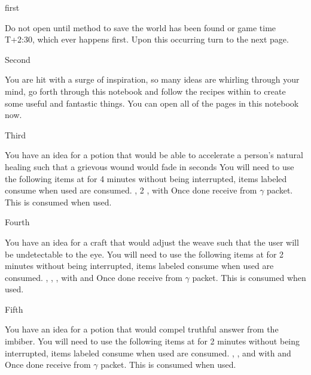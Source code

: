 \documentclass[greennotebook]{guildcamp3} %
\begin{document}
\startnotebook{\nMagTwoRecipes{}}

\begin{page}{first}
	
	Do not open until method to save the world has been found or game time T+2:30, which ever happens first. Upon this occurring turn to the next page.
	
\end{page}

\begin{page}{Second}
	
	You are hit with a surge of inspiration, so many ideas are whirling through your mind, go forth through this notebook and follow the recipes within to create some useful and fantastic things. You can open all of the pages in this notebook now.
	
\end{page}

\begin{page}{Third}
	
	You have an idea for a potion that would be able to accelerate a person's natural healing such that a grievous wound would fade in seconds
	You will need to use the following items at \sMageWorkbench{} for 4 minutes without being interrupted, items labeled consume when used are consumed.
	\iPhoenixFeather{}, 2 \iHolyWater{}, \iUnicornHoof{} with \iMortarPestle{}
	Once done receive \iHealthRemedy{} from $\gamma$ packet. This is consumed when used. 
	
\end{page}

\begin{page}{Fourth}
	
	You have an idea for a craft that would adjust the weave such that the user will be undetectable to the eye.
	You will need to use the following items at\sMageWorkbench{} for 2 minutes without being interrupted, items labeled consume when used are consumed.
	\iDragonSkin{}, \iStardust{}, \iHolyWater{}, with \iQuartz{} and \iRabbitsFoot{}
	Once done receive \iInvisibilityCloak{} from $\gamma$ packet. This is consumed when used.  
	
\end{page}

\begin{page}{Fifth}
	
	You have an idea for a potion that would compel truthful answer from the imbiber.
	You will need to use the following items at \sMageWorkbench{} for 2 minutes without being interrupted, items labeled consume when used are consumed.
	\iBelladonna{}, \iUnicornHoof{}, and \iHolyWater{} with \iCauldron{} and \iVial{}
	Once done receive \iTruthPotion{} from $\gamma$ packet. This is consumed when used. 
	
\end{page}
\end{document}

